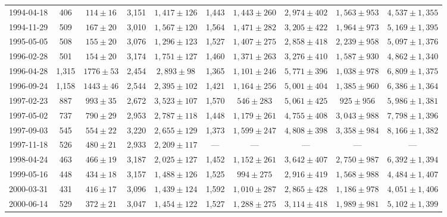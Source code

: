 \begin{landscape}
\begin{longtable}{cccccccccc}
{1994-04-18} & 406 & {$114  \pm  16$} & 3,151 & {$1,417 \pm 126$} & 1,443 & {$1,443 \pm 260$} & {$2,974 \pm 402$} & {$1,563 \pm 953$} & {$4,537 \pm 1,355$} \\
{1994-11-29} & 509 & {$167  \pm  20$} & 3,010 & {$1,567 \pm 120$} & 1,564 & {$1,471 \pm 282$} & {$3,205 \pm 422$} & {$1,964 \pm 973$} & {$5,169 \pm 1,395$} \\
{1995-05-05} & 508 & {$155  \pm  20$} & 3,076 & {$1,296 \pm 123$} & 1,527 & {$1,407 \pm 275$} & {$2,858 \pm 418$} & {$2,239 \pm 958$} & {$5,097 \pm 1,376$} \\
{1996-02-28} & 501 & {$154  \pm  20$} & 3,174 & {$1,751 \pm 127$} & 1,460 & {$1,371 \pm 263$} & {$3,276 \pm 410$} & {$1,587 \pm 930$} & {$4,862 \pm 1,340$} \\
{1996-04-28} & 1,315 & {$1776  \pm  53$} & 2,454 & {$2,893 \pm 98$} & 1,365 & {$1,101 \pm 246$} & {$5,771 \pm 396$} & {$1,038 \pm 978$} & {$6,809 \pm 1,375$} \\
{1996-09-24} & 1,158 & {$1443  \pm  46$} & 2,544 & {$2,395 \pm 102$} & 1,421 & {$1,164 \pm 256$} & {$5,001 \pm 404$} & {$1,385 \pm 960$} & {$6,386 \pm 1,364$} \\
{1997-02-23} & 887 & {$993  \pm  35$} & 2,672 & {$3,523 \pm 107$} & 1,570 & {$546 \pm 283$} & {$5,061 \pm 425$} & {$925 \pm 956$} & {$5,986 \pm 1,381$} \\
{1997-05-02} & 737 & {$790  \pm  29$} & 2,953 & {$2,787 \pm 118$} & 1,448 & {$1,179 \pm 261$} & {$4,755 \pm 408$} & {$3,043 \pm 988$} & {$7,798 \pm 1,396$} \\
{1997-09-03} & 545 & {$554  \pm  22$} & 3,220 & {$2,655 \pm 129$} & 1,373 & {$1,599 \pm 247$} & {$4,808 \pm 398$} & {$3,358 \pm 984$} & {$8,166 \pm 1,382$} \\
{1997-11-18} & 526 & {$480  \pm  21$} & 2,933 & {$2,209 \pm 117$} & --- & --- & --- & --- & --- \\
{1998-04-24} & 463 & {$466  \pm  19$} & 3,187 & {$2,025 \pm 127$} & 1,452 & {$1,152 \pm 261$} & {$3,642 \pm 407$} & {$2,750 \pm 987$} & {$6,392 \pm 1,394$} \\
{1999-05-16} & 448 & {$434  \pm  18$} & 3,157 & {$1,488 \pm 126$} & 1,525 & {$994 \pm 275$} & {$2,916 \pm 419$} & {$1,568 \pm 988$} & {$4,484 \pm 1,407$} \\
{2000-03-31} & 431 & {$416  \pm  17$} & 3,096 & {$1,439 \pm 124$} & 1,592 & {$1,010 \pm 287$} & {$2,865 \pm 428$} & {$1,186 \pm 978$} & {$4,051 \pm 1,406$} \\
{2000-06-14} & 529 & {$372  \pm  21$} & 3,047 & {$1,454 \pm 122$} & 1,527 & {$1,288 \pm 275$} & {$3,114 \pm 418$} & {$1,989 \pm 981$} & {$5,102 \pm 1,399$} \\

\end{longtable}
\end{landscape}
